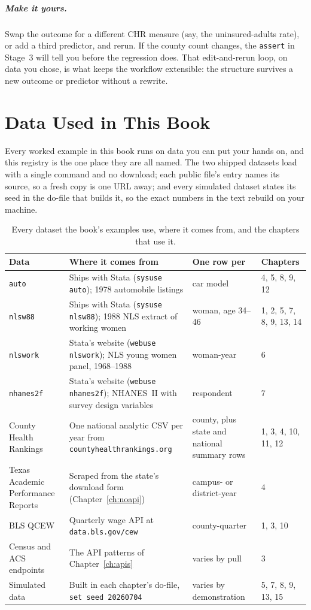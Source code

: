 \paragraph{Make it yours.} Swap the outcome for a different CHR measure (say, the uninsured-adults rate), or add a third predictor, and rerun. If the county count changes, the \texttt{assert} in Stage~3 will tell you before the regression does. That edit-and-rerun loop, on data you chose, is what keeps the workflow extensible: the structure survives a new outcome or predictor without a rewrite.

\backmatter
{}
\chapter{Data Used in This Book}\label{app:data}
Every worked example in this book runs on data you can put your hands on, and this registry is the one place they are all named. The two shipped datasets load with a single command and no download; each public file's entry names its source, so a fresh copy is one URL away; and every simulated dataset states its seed in the do-file that builds it, so the exact numbers in the text rebuild on your machine.

\begin{table}[htbp]
\centering
\footnotesize
\caption[Datasets used in this book]{Every dataset the book's examples use, where it comes from, and the chapters that use it.}
\label{tab:app-data}
\begin{tabular}{p{3.4cm}p{4.6cm}p{2.6cm}p{2.2cm}}
\hline
Data & Where it comes from & One row per & Chapters \\
\hline
\texttt{auto} & Ships with Stata (\texttt{sysuse auto}); 1978 automobile listings & car model & 4, 5, 8, 9, 12 \\
\texttt{nlsw88} & Ships with Stata (\texttt{sysuse nlsw88}); 1988 NLS extract of working women & woman, age 34--46 & 1, 2, 5, 7, 8, 9, 13, 14 \\
\texttt{nlswork} & Stata's website (\texttt{webuse nlswork}); NLS young women panel, 1968--1988 & woman-year & 6 \\
\texttt{nhanes2f} & Stata's website (\texttt{webuse nhanes2f}); NHANES~II with survey design variables & respondent & 7 \\
County Health Rankings & One national analytic CSV per year from \texttt{countyhealthrankings.org} & county, plus state and national summary rows & 1, 3, 4, 10, 11, 12 \\
Texas Academic Performance Reports & Scraped from the state's download form (Chapter~\ref{ch:noapi}) & campus- or district-year & 4 \\
BLS QCEW & Quarterly wage API at \texttt{data.bls.gov/cew} & county-quarter & 1, 3, 10 \\
Census and ACS endpoints & The API patterns of Chapter~\ref{ch:apis} & varies by pull & 3 \\
Simulated data & Built in each chapter's do-file, \texttt{set seed 20260704} & varies by demonstration & 5, 7, 8, 9, 13, 15 \\
\hline
\end{tabular}
\end{table}

